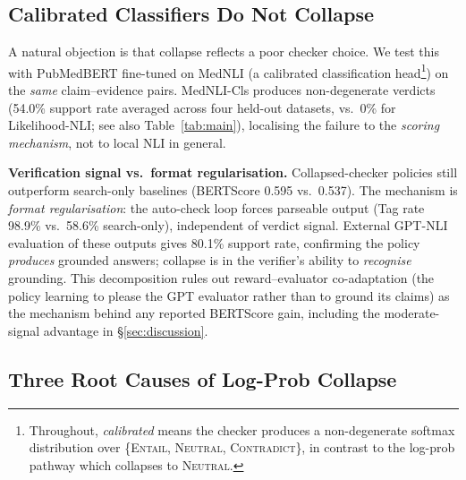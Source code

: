 \documentclass[11pt]{article}
\begin{document}
\subsection{Calibrated Classifiers Do Not Collapse}
\label{sec:no_collapse}

A natural objection is that collapse reflects a poor checker choice. We test this with PubMedBERT fine-tuned on MedNLI (a calibrated classification  head\footnote{Throughout, \emph{calibrated} means the checker produces a non-degenerate softmax distribution over \{\textsc{Entail}, \textsc{Neutral}, \textsc{Contradict}\}, in contrast to the log-prob pathway which collapses to \textsc{Neutral}.}) on the \emph{same} claim--evidence pairs. MedNLI-Cls produces non-degenerate verdicts (54.0\% support rate averaged across four held-out datasets, vs.\ 0\% for Likelihood-NLI; see also Table~\ref{tab:main}), localising the failure to the \emph{scoring mechanism}, not to local NLI in general.


\textbf{Verification signal vs.\ format regularisation.}
Collapsed-checker policies still outperform
search-only baselines (BERTScore 0.595 vs.\ 0.537).
The mechanism is \emph{format regularisation}: the
auto-check loop forces parseable output (Tag rate
98.9\% vs.\ 58.6\% search-only), independent of
verdict signal. External GPT-NLI evaluation of these
outputs gives 80.1\% support rate, confirming the policy
\emph{produces} grounded answers; collapse is in the
verifier's ability to \emph{recognise} grounding.
This decomposition rules out reward--evaluator co-adaptation (the policy learning to please the GPT evaluator rather than to ground its claims) as the mechanism behind any reported BERTScore gain, including the moderate-signal advantage in \S\ref{sec:discussion}.
\subsection{Three Root Causes of Log-Prob Collapse}
\label{sec:three_causes}
\end{document}
